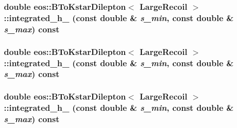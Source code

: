 \label{classeos_1_1BToKstarDilepton_3_01LargeRecoil_01_4_a9406f153b7bcda724228031edccb4eff}
\hypertarget{classeos_1_1BToKstarDilepton_3_01LargeRecoil_01_4_ace2820ec3a4e8d3eda907e764ab57c22}{
\subsubsection[{integrated\_\-h\_\-2}]{\setlength{\rightskip}{0pt plus 5cm}double eos::BToKstarDilepton$<$ {\bf LargeRecoil} $>$::integrated\_\-h\_ (const double \& {\em s\_\-min}, \/  const double \& {\em s\_\-max}) const}}
\label{classeos_1_1BToKstarDilepton_3_01LargeRecoil_01_4_ace2820ec3a4e8d3eda907e764ab57c22}
\hypertarget{classeos_1_1BToKstarDilepton_3_01LargeRecoil_01_4_aa2dd5c9566afd338c8edf08fc81f488a}{
\subsubsection[{integrated\_\-h\_\-3}]{\setlength{\rightskip}{0pt plus 5cm}double eos::BToKstarDilepton$<$ {\bf LargeRecoil} $>$::integrated\_\-h\_ (const double \& {\em s\_\-min}, \/  const double \& {\em s\_\-max}) const}}
\label{classeos_1_1BToKstarDilepton_3_01LargeRecoil_01_4_aa2dd5c9566afd338c8edf08fc81f488a}
\hypertarget{classeos_1_1BToKstarDilepton_3_01LargeRecoil_01_4_ad896f9ffdac50023898990437c9c8852}{
\subsubsection[{integrated\_\-h\_\-4}]{\setlength{\rightskip}{0pt plus 5cm}double eos::BToKstarDilepton$<$ {\bf LargeRecoil} $>$::integrated\_\-h\_ (const double \& {\em s\_\-min}, \/  const double \& {\em s\_\-max}) const}}
\label{classeos_1_1BToKstarDilepton_3_01LargeRecoil_01_4_ad896f9ffdac50023898990437c9c8852}
